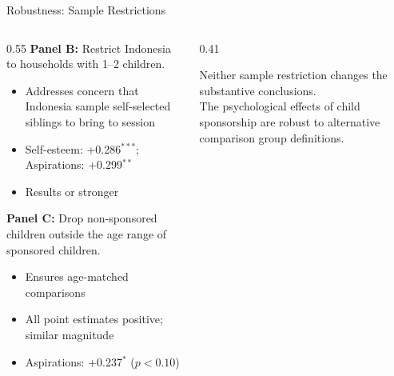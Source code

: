 \documentclass[aspectratio=169, 10pt]{beamer}
\begin{document}
\begin{frame}{Robustness: Sample Restrictions}
  \begin{columns}
    \begin{column}{0.55\textwidth}
      \textbf{Panel B:} Restrict Indonesia to households with 1--2 children.
      \begin{itemize}
        \item Addresses concern that Indonesia sample self-selected siblings to bring to session
        \item Self-esteem: +0.286$^{***}$; Aspirations: +0.299$^{**}$
        \item Results  or stronger
      \end{itemize}
      \vspace{0.5em}
      \textbf{Panel C:} Drop non-sponsored children outside the age range of sponsored children.
      \begin{itemize}
        \item Ensures age-matched comparisons
        \item All point estimates positive; similar magnitude
        \item Aspirations: +0.237$^{*}$ ($p < 0.10$)
      \end{itemize}
    \end{column}
    \begin{column}{0.41\textwidth}
      \begin{keybox}
        Neither sample restriction changes the substantive conclusions.\\[0.4em]
        The psychological effects of child sponsorship are robust to alternative comparison group definitions.
      \end{keybox}
    \end{column}
  \end{columns}
\end{frame}
\end{document}
